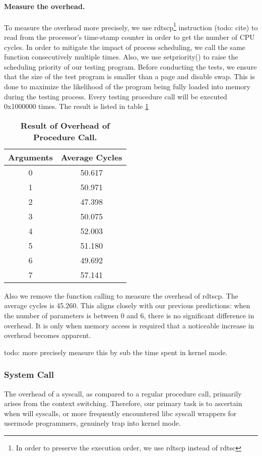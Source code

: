 \paragraph{Measure the overhead.} To measure the overhead more precisely, we use rdtscp\footnote{In order to preserve the execution order, we use rdtscp instead of rdtsc} instruction (todo: cite) to read from the processor’s time-stamp counter in order to get the number of CPU cycles. In order to mitigate the impact of process scheduling, we call the same function consecutively multiple times. Also, we use setpriority() to raise the scheduling priority of our testing program. Before conducting the tests, we ensure that the size of the test program is smaller than a page and disable swap. This is done to maximize the likelihood of the program being fully loaded into memory during the testing process. Every testing procedure call will be executed 0x1000000 times. The result is listed in table \ref{table:procedure-test}
\begin{table}[h]
	\centering
	\begin{tabular}{c|c}
		\hline
		\bf{Arguments} & \bf{Average Cycles} \\ \hline
		0 & 50.617 \\ \hline
		1 & 50.971 \\ \hline
		2 & 47.398 \\ \hline
        3 & 50.075 \\ \hline
        4 & 52.003 \\ \hline
        5 & 51.180 \\ \hline
        6 & 49.692 \\ \hline
        7 & 57.141 \\ \hline
	\end{tabular}
	\caption{\textbf{Result of Overhead of Procedure Call.}}
	\label{table:procedure-test}
\end{table}
Also we remove the function calling to measure the overhead of rdtscp.
The average cycles is 45.260. This aligns closely with our previous predictions: when the number of parameters is between 0 and 6, there is no significant difference in overhead. It is only when memory access is required that a noticeable increase in overhead becomes apparent.

todo: more precisely measure this by sub the time spent in kernel mode.

\subsubsection{System Call}
The overhead of a syscall, as compared to a regular procedure call, primarily arises from the context switching. Therefore, our primary task is to ascertain when will syscalls, or more frequently encountered libc syscall wrappers for usermode programmers, genuinely trap into kernel mode.

